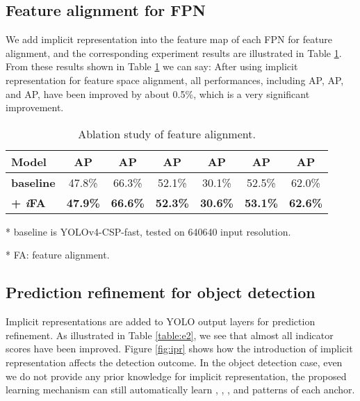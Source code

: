 \documentclass[10pt,twocolumn,letterpaper]{article}
\begin{document}
\newpage

\subsection{Feature alignment for FPN}
\label{sec:fa}

We add implicit representation into the feature map of each FPN for feature alignment, and the corresponding experiment results are illustrated in Table \ref{table:e1}. From these results shown in Table \ref{table:e1} we can say: After using implicit representation for feature space alignment, all performances, including AP, AP, and AP, have been improved by about 0.5\%, which is a very significant improvement.

\begin{table}[h]
	\centering
	\begin{threeparttable}[h]
		\footnotesize
		\caption{Ablation study of feature alignment.}
		\label{table:e1}
		\setlength\tabcolsep{4.5pt}
		\begin{tabular}{lcccccc}
			\toprule
			\textbf{Model} & \textbf{AP} & \textbf{AP} & \textbf{AP} & \textbf{AP} & \textbf{AP} & \textbf{AP} \\				
			\midrule
			\textbf{baseline} & 47.8\% & 66.3\% & 52.1\% & 30.1\% & 52.5\% & 62.0\% \\
			\textbf{+ \textit{i}FA} & \textbf{47.9\%} & \textbf{66.6\%} & \textbf{52.3\%} & \textbf{30.6\%} & \textbf{53.1\%} & \textbf{62.6\%} \\
			\bottomrule
		\end{tabular}
		\begin{tablenotes}[flushleft]
			\footnotesize
			\item[*] baseline is YOLOv4-CSP-fast, tested on 640640 input resolution.
			\item[*] FA: feature alignment.
		\end{tablenotes}
	\end{threeparttable}
\end{table}

\subsection{Prediction refinement for object detection}
\label{sec:pr}

Implicit representations are added to YOLO output layers for prediction refinement. As illustrated in Table \ref{table:e2}, we see that almost all indicator scores have been improved. Figure \ref{fig:ipr} shows how the introduction of implicit representation affects the detection outcome. In the object detection case, even we do not provide any prior knowledge for implicit representation, the proposed learning mechanism can still automatically learn , , , and  patterns of each anchor.
\end{document}

